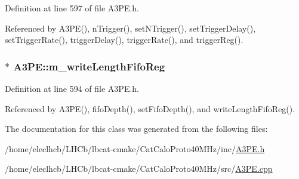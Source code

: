 Definition at line 597 of file A3PE.h.

Referenced by A3PE(), nTrigger(), setNTrigger(), setTriggerDelay(), setTriggerRate(), triggerDelay(), triggerRate(), and triggerReg().\hypertarget{classA3PE_a9a0cb2253ea34c0be567a03684217fee}{
\subsubsection[{m\_\-writeLengthFifoReg}]{$\ast$ {\bf A3PE::m\_\-writeLengthFifoReg}}}
\label{classA3PE_a9a0cb2253ea34c0be567a03684217fee}


Definition at line 594 of file A3PE.h.

Referenced by A3PE(), fifoDepth(), setFifoDepth(), and writeLengthFifoReg().

The documentation for this class was generated from the following files:\begin{DoxyCompactItemize}
\item 
/home/eleclhcb/LHCb/lbcat-\/cmake/CatCaloProto40MHz/inc/\hyperlink{A3PE_8h}{A3PE.h}\item 
/home/eleclhcb/LHCb/lbcat-\/cmake/CatCaloProto40MHz/src/\hyperlink{A3PE_8cpp}{A3PE.cpp}\end{DoxyCompactItemize}
